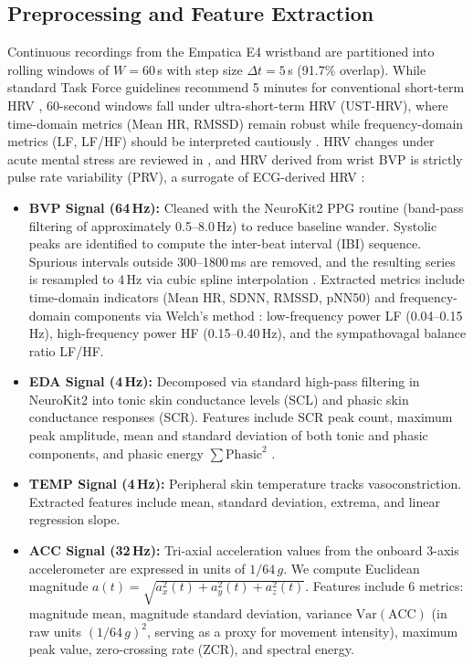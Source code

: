 \documentclass[conference]{IEEEtran}
\begin{document}
\subsection{Preprocessing and Feature Extraction}
Continuous recordings from the Empatica E4 wristband are partitioned into rolling windows of $W = 60$\,s with step size $\Delta t = 5$\,s (91.7\% overlap). While standard Task Force guidelines recommend 5 minutes for conventional short-term HRV \cite{taskforce1996heart}, 60-second windows fall under ultra-short-term HRV (UST-HRV), where time-domain metrics (Mean HR, RMSSD) remain robust while frequency-domain metrics (LF, LF/HF) should be interpreted cautiously \cite{pecchia2018ultra, munoz2015validity}. HRV changes under acute mental stress are reviewed in \cite{castaldo2015acute}, and HRV derived from wrist BVP is strictly pulse rate variability (PRV), a surrogate of ECG-derived HRV \cite{schafer2013how}:
\begin{itemize}
    \item \textbf{BVP Signal (64\,Hz):} Cleaned with the NeuroKit2 PPG routine (band-pass filtering of approximately 0.5--8.0\,Hz) \cite{makowski2021neurokit2} to reduce baseline wander. Systolic peaks are identified to compute the inter-beat interval (IBI) sequence. Spurious intervals outside 300--1800\,ms are removed, and the resulting series is resampled to 4\,Hz via cubic spline interpolation \cite{tarvainen2014kubios}. Extracted metrics include time-domain indicators (Mean HR, SDNN, RMSSD, pNN50) and frequency-domain components via Welch's method \cite{welch1967use}: low-frequency power LF (0.04--0.15\,Hz), high-frequency power HF (0.15--0.40\,Hz), and the sympathovagal balance ratio LF/HF.
    \item \textbf{EDA Signal (4\,Hz):} Decomposed via standard high-pass filtering in NeuroKit2 \cite{makowski2021neurokit2, boucsein2012electrodermal} into tonic skin conductance levels (SCL) and phasic skin conductance responses (SCR). Features include SCR peak count, maximum peak amplitude, mean and standard deviation of both tonic and phasic components, and phasic energy $\sum \text{Phasic}^2$ \cite{boucsein2012electrodermal}.
    \item \textbf{TEMP Signal (4\,Hz):} Peripheral skin temperature tracks vasoconstriction. Extracted features include mean, standard deviation, extrema, and linear regression slope.
    \item \textbf{ACC Signal (32\,Hz):} Tri-axial acceleration values from the onboard 3-axis accelerometer are expressed in units of $1/64\,g$. We compute Euclidean magnitude $a(t) = \sqrt{a_x^2(t) + a_y^2(t) + a_z^2(t)}$. Features include 6 metrics: magnitude mean, magnitude standard deviation, variance $\text{Var}(\text{ACC})$ (in raw units $(1/64\,g)^2$, serving as a proxy for movement intensity), maximum peak value, zero-crossing rate (ZCR), and spectral energy.
\end{itemize}
\end{document}
